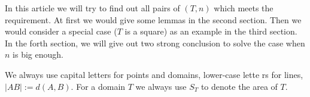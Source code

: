 In this article we will try to find out all pairs of $(T, n)$ which meets
the requirement. At first we would give some lemmas in the second
section. Then we would consider a special case ($T$ is a square)
as an example in the third section. In the forth section, we will
give out two strong conclusion to solve the case when $n$ is big enough.
		
We always use capital letters for points and domains, lower-case lette
rs for lines,  $|AB| := d(A, B)$. For a domain $T$ we always use $S_T$
to denote the area of $T$.